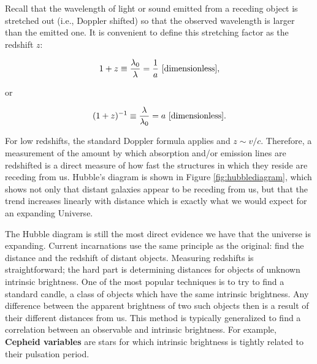 \documentclass[a4paper,11pt]{article}
\begin{document}
{\noindent}Recall that the wavelength of light or sound emitted from a receding object is stretched out (i.e., Doppler shifted) so that the observed wavelength is larger than the emitted one. It is convenient to define this stretching factor as the redshift $z$:

\begin{align*}
    1+z \equiv \frac{\lambda_0}{\lambda} = \frac{1}{a} ~ [{\rm dimensionless}],
\end{align*}

{\noindent}or

\begin{align*}
    (1+z)^{-1} \equiv \frac{\lambda}{\lambda_0} = a ~ [{\rm dimensionless}].
\end{align*}

{\noindent}For low redshifts, the standard Doppler formula applies and $z \sim v/c$. Therefore, a measurement of the amount by which absorption and/or emission lines are redshifted is a direct measure of how fast the structures in which they reside are receding from us. Hubble's diagram is shown in Figure \ref{fig:hubblediagram}, which shows not only that distant galaxies appear to be receding from us, but that the trend increases linearly with distance which is exactly what we would expect for an expanding Universe.

{\noindent}The Hubble diagram is still the most direct evidence we have that the universe is expanding. Current incarnations use the same principle as the original: find the distance and the redshift of distant objects. Measuring redshifts is straightforward; the hard part is determining distances for objects of unknown intrinsic brightness. One of the most popular techniques is to try to find a standard candle, a class of objects which have the same intrinsic brightness. Any difference between the apparent brightness of two such objects then is a result of their different distances from us. This method is typically generalized to find a correlation between an observable and intrinsic brightness. For example, \textbf{Cepheid variables} are stars for which intrinsic brightness is tightly related to their pulsation period.
\end{document}
